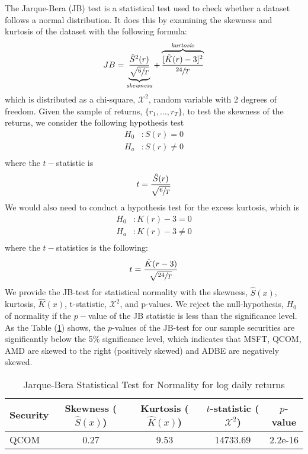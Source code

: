 The Jarque-Bera (JB) test is a statistical test used to check whether a dataset follows a normal distribution. It does this by examining the skewness and kurtosis of the dataset with the following formula:
\begin{equation}
	JB= \underbrace{\frac{\hat{S}^2(r)}{\sqrt{\sfrac{6}{T}}}}_{\textit{skewness}}  +\overbrace{\frac{[\hat{K}(r)-3]^2}{\sfrac{24}{T}}}^{\textit{kurtosis}}
\end{equation}
which is distributed as a chi-square, $\mathcal{X}^2$, random variable with 2 degrees of freedom. Given the sample of returns, $\lbrace r_1,\ldots,r_T\rbrace$, to test the skewness of the returns, we consider the following hypothesis test
\[
\begin{aligned}
	H_0&:S(r)= 0\\
	H_a&:S(r)\neq 0\\
\end{aligned}
\]
where the $t-$statistic is 
\begin{equation}
	t=\frac{\hat{S}(r)}{\sqrt{\sfrac{6}{T}}}
\end{equation}
We would also need to conduct a hypothesis test for the excess kurtosis, which is
\[
\begin{aligned}
	H_0&:K(r)-3= 0\\
	H_a&:K(r)-3\neq 0\\
\end{aligned}
\]
where the $t-$statistics is the following:
\begin{equation}
	t=\frac{\hat{K}(r-3)}{\sqrt{\sfrac{24}{T}}}
\end{equation}
We provide the JB-test for statistical normality with the skewness, $\hat{S}(x)$, kurtosis, $\hat{K}(x)$, t-statistic, $\mathcal{X}^2$, and p-values. We reject the null-hypothesis, $H_0$ of normality if the $p-$value of the JB statistic is less than the significance level. As the Table (\ref*{tab:jbtest}) shows, the $p$-values of the JB-test for our sample securities are significantly below the 5\% significance level, which indicates that MSFT, QCOM, AMD are skewed to the right (positively skewed) and ADBE are negatively skewed.
\begin{table}[ht]
	\centering
	\caption{Jarque-Bera Statistical Test for Normality for log daily returns}
	\begin{tabular}[t]{lcccc}
		\toprule
		Security & Skewness ($\hat{S}(x)$) & Kurtosis ($\hat{K}(x)$) & $t$-statistic ($\mathcal{X}^2$) & $p$-value \\
		\midrule
		QCOM & 0.27 & 9.53 & 14733.69 & 2.2e-16 \\				
		\bottomrule
	\end{tabular}\label{tab:jbtest}
\end{table}